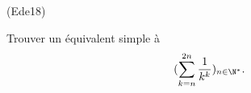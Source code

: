 \begin{tiny}(Ede18)\end{tiny} Trouver un {\'e}quivalent simple {\`a}
\[
(\sum_{k=n}^{2n}\frac{1}{k^{k}})_{n\in \N^{*}}.
\]